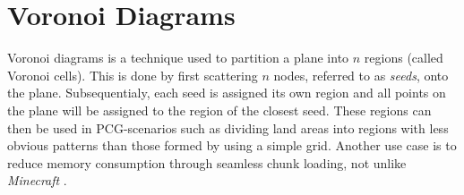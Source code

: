 \section{Voronoi Diagrams}

Voronoi diagrams is a technique used to partition a plane into $n$ regions (called Voronoi cells).
This is done by first scattering $n$ nodes, referred to as \textit{seeds}, onto the plane.
Subsequentialy, each seed is assigned its own region and all points on the plane will be assigned to the region of the closest seed.
These regions can then be used in PCG-scenarios such as dividing land areas into regions with less obvious patterns than those formed by using a simple grid.
Another use case is to reduce memory consumption through seamless chunk loading, not unlike \textit{Minecraft} \cite{minecraft}.

